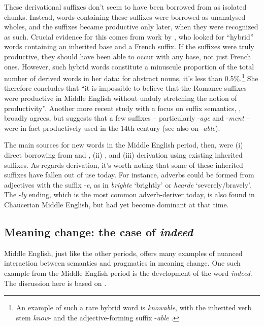These derivational suffixes don't seem to have been borrowed from  as isolated chunks. Instead, words containing these suffixes were borrowed as unanalysed wholes, and the suffixes became productive only later, when they were recognized as such. Crucial evidence for this comes from work by \citet{Dalton-Puffer1996}, who looked for ``hybrid'' words containing an inherited base and a French suffix. If the  suffixes were truly productive, they should have been able to occur with any base, not just French ones. However, such hybrid words constitute a minuscule proportion of the total number of derived words in her data: for abstract nouns, it's less than 0.5\%.\footnote{An example of such a rare hybrid word is \emph{knowable}, with the inherited verb stem \emph{know}- and the  adjective-forming suffix -\emph{able} \citep[183]{Dalton-Puffer1996}.} She therefore concludes \citeyearpar[220]{Dalton-Puffer1996} that ``it is impossible to believe that the Romance suffixes were productive in Middle English without unduly stretching the notion of productivity''. Another more recent study with a focus on suffix semantics, \citet{Lloyd2011}, broadly agrees, but suggests that a few suffixes -- particularly -\emph{age} and -\emph{ment} -- were in fact productively used in the 14th century (see also \citet{TripsStein2008} on -\emph{able}).

The main sources for new words in the Middle English period, then, were (i) direct borrowing from  and , (ii) , and (iii) derivation using existing inherited suffixes. As regards derivation, it's worth noting that some of these inherited suffixes have fallen out of use today. For instance, adverbs could be formed from adjectives with the suffix -\emph{e}, as in \emph{brighte} `brightly' or \emph{hearde} `severely/bravely'. The -\emph{ly} ending, which is the most common adverb-deriver today, is also found in Chaucerian Middle English, but had yet become dominant at that time.

\subsection{Meaning change: the case of \emph{indeed}}\label{ME-meaning}
Middle English, just like the other periods, offers many examples of nuanced interaction between semantics and pragmatics in meaning change. One such example from the Middle English period is the development of the word \emph{indeed}. The discussion here is based on \citet[159--165]{TraugottDasher2002}.

